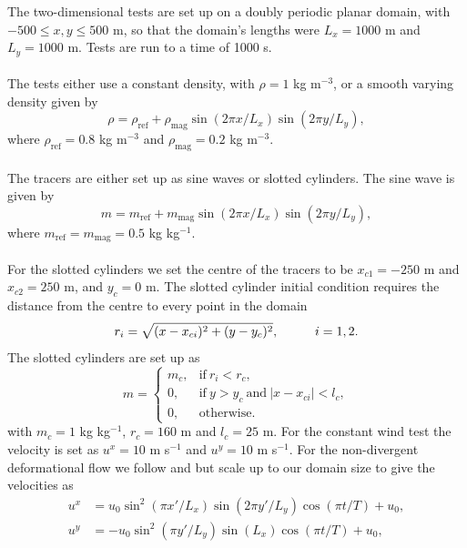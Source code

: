 \documentclass{ametsocV6.1}
\begin{document}
The two-dimensional tests are set up on a doubly periodic planar domain, with $-500 \leq x,y \leq 500$ m, so that the domain's lengths were $L_x=1000$ m and $L_y=1000$ m.
Tests are run to a time of 1000 s.
\\
\\
The tests either use a constant density, with $\rho=1$ kg m$^{-3}$, or a smooth varying density given by
\begin{equation}
    \rho = \rho_{\mathrm{ref}} + \rho_{\mathrm{mag}} \sin(2 \pi x/L_x) \sin(2 \pi y/L_y),
\end{equation}
where $\rho_{\mathrm{ref}}=0.8$ kg m$^{-3}$ and $\rho_{\mathrm{mag}}=0.2$ kg m$^{-3}$. \\ 
\\
The tracers are either set up as sine waves or slotted cylinders. The sine wave is given by
\begin{equation}
    m = m_{\mathrm{ref}} + m_{\mathrm{mag}} \sin(2 \pi x/L_x) \sin(2 \pi y/L_y),
\end{equation} 
where $m_{\mathrm{ref}}=m_{\mathrm{mag}}=0.5$ kg kg$^{-1}$. \\
\\
For the slotted cylinders we set the centre of the tracers to be $x_{c1} = -250$ m and $x_{c2}=250$ m, and $y_c=0$ m.
The slotted cylinder initial condition requires the distance from the centre to every point in the domain
\begin{equation}
    r_i = \sqrt{(x-x_{ci})^2+(y-y_c)^2}, \hspace*{1cm} i=1,2.
\end{equation}
The slotted cylinders are set up as
\begin{equation}
    m = 
    \begin{cases}
        m_c, & \mathrm{if} \ r_i < r_c, \\
        0, & \mathrm{if} \ y>y_c \ \mathrm{and} \ |x-x_{ci}|<l_c, \\
        0, & \mathrm{otherwise}.
    \end{cases}
\end{equation}
with $m_c=1$ kg kg$^{-1}$, $r_c=160$ m and $l_c=25$ m.
For the constant wind test the velocity is set as $u^x=10$ m s$^{-1}$ and $u^y=10$ m s$^{-1}$. For the non-divergent deformational flow we follow \cite{skamarock2006limiters} and \citet{kent2020positive} but scale up to our domain size to give the velocities as
\begin{subequations}
\begin{align}
u^x & =  u_0 \sin^2(\pi x'/L_x)\sin(2 \pi y'/L_y)\cos(\pi t/T)+u_0,\\ 
u^y & = -u_0 \sin^2(\pi y'/L_y)\sin(L_x)\cos(\pi t/T)+u_0,
\end{align}
\end{subequations}
\end{document}
